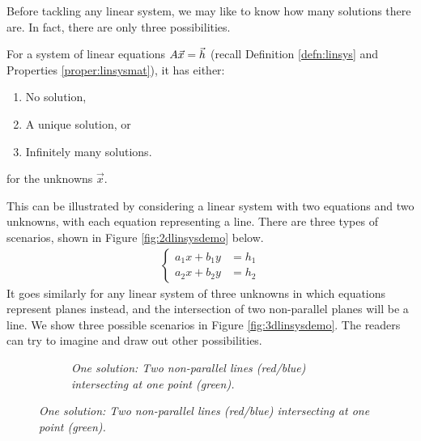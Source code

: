 Before tackling any linear system, we may like to know how many solutions there are. In fact, there are only three possibilities.
\begin{thm}
For a system of linear equations $A\vec{x} = \smash{\vec{h}}$ (recall Definition \ref{defn:linsys} and Properties \ref{proper:linsysmat}), it has either:
\begin{enumerate}
\item No solution,
\item A unique solution, or
\item Infinitely many solutions.
\end{enumerate}
for the unknowns $\vec{x}$.
\end{thm}
This can be illustrated by considering a linear system with two equations and two unknowns, with each equation representing a line. There are three types of scenarios, shown in Figure \ref{fig:2dlinsysdemo} below.
\begin{align}
\label{eqn:2dlinsysdemo}
\left\{\begin{alignedat}{1}
a_1x + b_1y &= h_1 \\
a_2x + b_2y &= h_2
\end{alignedat}\right.
\end{align}
It goes similarly for any linear system of three unknowns in which equations represent planes instead, and the intersection of two non-parallel planes will be a line. We show three possible scenarios in Figure \ref{fig:3dlinsysdemo}. The readers can try to imagine and draw out other possibilities.
\begin{figure}[hb!]
\centering
\begin{subfigure}{0.7\textwidth}
\centering
{} 
\caption{\textit{One solution: Two non-parallel lines (red/blue) intersecting at one point (green).}}
\end{subfigure}
\end{figure}
